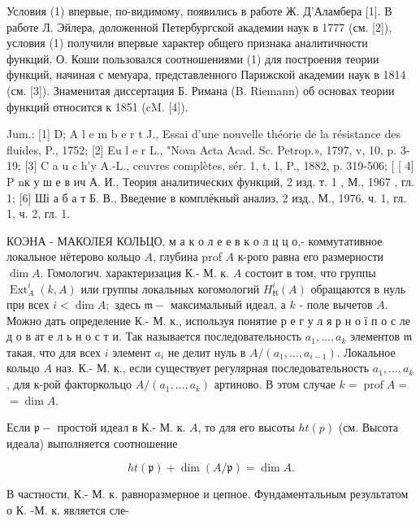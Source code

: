 \documentclass[10pt]{article}
\begin{document}
Условия (1) впервые, по-видимому, появились в работе Ж. Д'Аламбера [1]. В работе Л. Эйлера, доложенной Петербургской академии наук в 1777 (см. [2]), условия (1) получили впервые характер общего признака аналитичности функций. О. Коши пользовался соотношениями (1) для построения теории функций, начиная с мемуара, представленного Парижской академии наук в 1814 (см. [3]). Знаменитая диссертация Б. Римана (B. Riemann) об основах теории функций относится к 1851 (cM. [4]).



Jum.: [1] D; A l e m b e r t J., Essai d'une nouvelle théorie de la résistance des fluides, P., 1752; [2] Eu l e r L., "Nova Acta Acad. Sc. Petrop.», 1797, v, 10, p. 3-19; [3] C a u c h'y A.-L., ceuvres complètes, sér. 1, t. 1, P., 1882, p. 319-506; [ [ 4] P nк у ш е в ич А. И., Теория аналитических функций, 2 изд. т. 1 , М., 1967 , гл. 1; [6] Ші а б а т Б. В., Введение в комплёкный анализ, 2 изд., М., 1976, ч. 1, гл. 1, ч. 2, гл. 1.



КОЭНА - МАКОЛЕЯ КОЛЬЦО, м а к о л е е в к о л ц ц о,- коммутативное локальное нётерово кольцо $A$, глубина prof $A$ к-рого равна его размерности $\operatorname{dim} A$. Гомологич. характеризация К.- М. к. $A$ состоит в том, что группы $\operatorname{Ext}_{A}^{i}(k, A)$ или группы локальных когомологий $H_{\mathfrak{k l}}^{i}(A)$ обращаются в нуль при всех $i<\operatorname{dim} A ;$ здесь $\mathfrak{m}-$ максимальный идеал, а $k$ - поле вычетов $A$. Можно дать определение К.- М. к., используя понятие р е г у л я р н о ї п о с ле д о в ат е л ь н о с т и. Так называется последовательность $a_{1}, \ldots, a_{k}$ элементов $\mathfrak{m}$ такая, что для всех $i$ элемент $a_{i}$ не делит нуль в $A /\left(a_{1}, \ldots, a_{i-1}\right)$. Локальное кольцо $A$ наз. К.- М. к., если существует регулярная последовательность $a_{1}, \ldots, a_{k}$, для к-рой факторкольцо $A /\left(a_{1}, \ldots, a_{k}\right)$ артиново. В этом случае $k=\operatorname{prof} A=$ $=\operatorname{dim} A$.



Если $\mathfrak{p}-$ простой идеал в К.- М. к. $A$, то для его высоты $h t(p)$ (см. Высота идеала) выполняется соотношение



\[

h t(\mathfrak{p})+\operatorname{dim}(A / \mathfrak{p})=\operatorname{dim} A .

\]



В частности, К.- М. к. равноразмерное и цепное. Фундаментальным результатом о К. -М. к. является сле-
\end{document}
